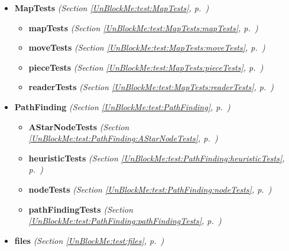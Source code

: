 \begin{itemize}
\setlength{\parskip}{0ex}
\item \textbf{MapTests}
  \textit{(Section \ref{UnBlockMe:test:MapTests}, p.~\pageref{UnBlockMe:test:MapTests})}

  \begin{itemize}
\setlength{\parskip}{0ex}
    \item \textbf{mapTests}
  \textit{(Section \ref{UnBlockMe:test:MapTests:mapTests}, p.~\pageref{UnBlockMe:test:MapTests:mapTests})}

    \item \textbf{moveTests}
  \textit{(Section \ref{UnBlockMe:test:MapTests:moveTests}, p.~\pageref{UnBlockMe:test:MapTests:moveTests})}

    \item \textbf{pieceTests}
  \textit{(Section \ref{UnBlockMe:test:MapTests:pieceTests}, p.~\pageref{UnBlockMe:test:MapTests:pieceTests})}

    \item \textbf{readerTests}
  \textit{(Section \ref{UnBlockMe:test:MapTests:readerTests}, p.~\pageref{UnBlockMe:test:MapTests:readerTests})}

  \end{itemize}
\item \textbf{PathFinding}
  \textit{(Section \ref{UnBlockMe:test:PathFinding}, p.~\pageref{UnBlockMe:test:PathFinding})}

  \begin{itemize}
\setlength{\parskip}{0ex}
    \item \textbf{AStarNodeTests}
  \textit{(Section \ref{UnBlockMe:test:PathFinding:AStarNodeTests}, p.~\pageref{UnBlockMe:test:PathFinding:AStarNodeTests})}

    \item \textbf{heuristicTests}
  \textit{(Section \ref{UnBlockMe:test:PathFinding:heuristicTests}, p.~\pageref{UnBlockMe:test:PathFinding:heuristicTests})}

    \item \textbf{nodeTests}
  \textit{(Section \ref{UnBlockMe:test:PathFinding:nodeTests}, p.~\pageref{UnBlockMe:test:PathFinding:nodeTests})}

    \item \textbf{pathFindingTests}
  \textit{(Section \ref{UnBlockMe:test:PathFinding:pathFindingTests}, p.~\pageref{UnBlockMe:test:PathFinding:pathFindingTests})}

  \end{itemize}
\item \textbf{files}
  \textit{(Section \ref{UnBlockMe:test:files}, p.~\pageref{UnBlockMe:test:files})}

\end{itemize}


